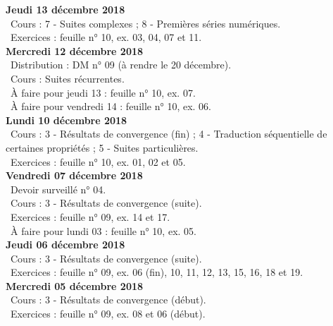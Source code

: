 \documentclass[12pt,a4paper]{article}
\begin{document}
\noindent\textbf{Jeudi 13 décembre 2018}\\
\bu\ Cours : 7 - Suites complexes ; 8 - Premières séries numériques.\\
\bu\ Exercices : feuille n° 10, ex. 03, 04, 07 et 11.\vspace{.4cm}\\
 
\noindent\textbf{\bf Mercredi 12 décembre 2018}\\
\bu\ Distribution : DM n° 09 (à rendre le 20 décembre).\\
\bu\ Cours : Suites récurrentes.\\
\bu\ À faire pour jeudi 13 : feuille n° 10, ex. 07.\\
\bu\ À faire pour vendredi 14 : feuille n° 10, ex. 06.\vspace{.4cm}\\

\noindent\textbf{Lundi 10 décembre 2018}\\
\bu\ Cours : 3 - Résultats de convergence (fin) ; 4 - Traduction séquentielle de certaines propriétés ; 5 - Suites particulières.\\
\bu\ Exercices : feuille n° 10, ex. 01, 02 et 05.\vspace{.4cm}\\
 
\noindent\textbf{Vendredi 07 décembre 2018}\\
\bu\ Devoir surveillé n° 04.\\
\bu\ Cours : 3 - Résultats de convergence (suite).\\
\bu\ Exercices : feuille n° 09, ex. 14 et 17.\\
\bu\ À faire pour lundi 03 : feuille n° 10, ex. 05.\vspace{.4cm}\\
 
\noindent\textbf{Jeudi 06 décembre 2018}\\
\bu\ Cours : 3 - Résultats de convergence (suite).\\
\bu\ Exercices : feuille n° 09, ex. 06 (fin), 10, 11, 12, 13, 15, 16, 18 et 19.\vspace{.4cm}\\
 
\noindent\textbf{\bf Mercredi 05 décembre 2018}\\
\bu\ Cours : 3 - Résultats de convergence (début).\\
\bu\ Exercices : feuille n° 09, ex. 08 et 06 (début).\vspace{.4cm}\\
 
\end{document}
